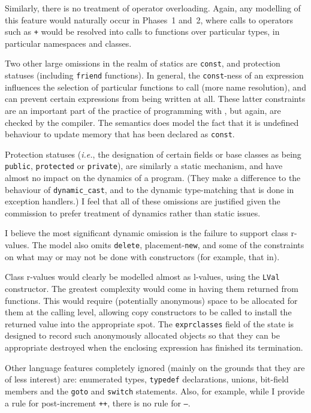 \documentclass[11pt]{article}
\newcommand{\ie}{\emph{i.e.}}
\begin{document}
Similarly, there is no treatment of operator overloading.  Again, any
modelling of this feature would naturally occur in Phases~1 and~2,
where calls to operators such as \texttt{+} would be resolved into
calls to functions over particular types, in particular namespaces and
classes.

Two other large omissions in the realm of statics are \texttt{const},
and protection statuses (including \texttt{friend} functions).  In
general, the \texttt{const}-ness of an expression influences the
selection of particular functions to call (more name resolution), and
can prevent certain expressions from being written at all.  These
latter constraints are an important part of the practice of
programming with \cpp{}, but again, are checked by the compiler.  The
semantics does model the fact that it is undefined behaviour to update
memory that has been declared as \texttt{const}.

Protection statuses (\ie, the designation of certain fields or base
classes as being \texttt{public}, \texttt{protected} or
\texttt{private}), are similarly a static mechanism, and have almost
no impact on the dynamics of a program.  (They make a difference to
the behaviour of \texttt{dynamic_cast}, and to the dynamic
type-matching that is done in exception handlers.)  I feel that all of
these omissions are justified given the commission to prefer treatment
of dynamics rather than static issues.

I believe the most significant dynamic omission is the failure to
support class r-values.  The model also omits \texttt{delete},
placement-\texttt{new}, and some of the constraints on what may or may
not be done with constructors (for example, that
in\cite[\S12.1,~para~15]{cpp-standard-iso14882}).

Class r-values would clearly be modelled almost as l-values, using the
\texttt{LVal} constructor.  The greatest
complexity would come in having them returned from functions.  This
would require (potentially anonymous) space to be allocated for them
at the calling level, allowing copy constructors to be called to
install the returned value into the appropriate spot.  The
\texttt{exprclasses}%
%
field of the state is designed to record such anonymously allocated
objects so that they can be appropriate destroyed when the enclosing
expression has finished its termination.

Other language features completely ignored (mainly on the grounds that
they are of less interest) are: enumerated types, \texttt{typedef}
declarations, unions, bit-field members and the \texttt{goto} and
\texttt{switch} statements.  Also, for example, while I provide a rule
for post-increment \texttt{++}, there is no rule for \texttt{--}.
\end{document}
